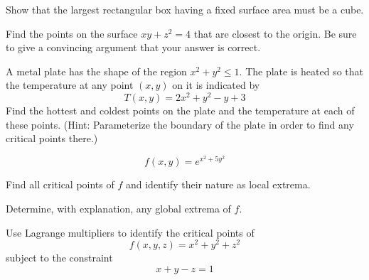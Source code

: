 \documentclass[boxes]{gsypset}
\begin{document}
	\begin{problem}[4.2.28]
		Show that the largest rectangular box having a fixed surface area must be a cube.
	\end{problem}
	\begin{solution}
		
	\end{solution}
	
	\begin{problem}[4.2.30]
		Find the points on the surface $xy + z^2 = 4$ that are closest to the origin.
		Be sure to give a convincing argument that your answer is correct.
	\end{problem}
	\begin{solution}
		
	\end{solution}
	
	\begin{problem}[4.2.34]
		A metal plate has the shape of the region $x^2 + y^2 \leq 1$.
		The plate is heated so that the temperature at any point $(x,y)$ on it is indicated by
		\[
			T(x,y) = 2x^2 + y^2 - y + 3
		\]
		Find the hottest and coldest points on the plate and the temperature at each of these points.
		(Hint: Parameterize the boundary of the plate in order to find any critical points there.)
	\end{problem}
	\begin{solution}
		
	\end{solution}
	
	\begin{problem}[4.2.46]
		\[
			f(x,y) = e^{x^2 + 5y^2}
		\]
		\begin{subproblems}
			\subproblem Find all critical points of $f$ and identify their nature as local extrema.
				\begin{solution}
					
				\end{solution}
				
			\subproblem Determine, with explanation, any global extrema of $f$.
				\begin{solution}
					
				\end{solution}
		\end{subproblems}
	\end{problem}
	
	\begin{problem}[4.3.6]
		Use Lagrange multipliers to identify the critical points of
		\[
			f(x,y,z) = x^2 + y^2 + z^2
		\]
		subject to the constraint
		\[
			x+y-z = 1
		\]
	\end{problem}
	\begin{solution}
		
	\end{solution}
	
\end{document}
